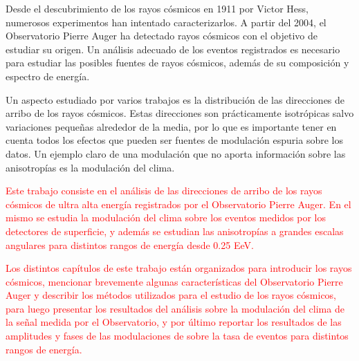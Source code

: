 


Desde el descubrimiento de los rayos cósmicos en 1911 por Victor Hess, numerosos experimentos han intentado caracterizarlos. A partir del 2004, el Observatorio Pierre Auger ha detectado rayos cósmicos con el objetivo de estudiar su origen. Un análisis adecuado de los eventos registrados es necesario para estudiar las posibles fuentes de rayos cósmicos, además de su composición y espectro de energía.

Un aspecto estudiado por varios trabajos \cite{collaboration2013pierre} \cite{data} es la distribución de las direcciones de arribo de los rayos cósmicos. Estas direcciones son prácticamente isotrópicas salvo variaciones pequeñas alrededor de la media, por lo que es importante tener en cuenta todos los efectos que pueden ser fuentes de modulación espuria sobre los datos. Un ejemplo claro de una modulación que no aporta información sobre las anisotropías es la modulación del clima.

\textcolor{red}{Este trabajo consiste en el análisis de las direcciones de arribo de los rayos cósmicos de ultra alta energía registrados por el Observatorio Pierre Auger. En el mismo se estudia la modulación del clima sobre los eventos medidos por los detectores de superficie, y además se estudian las anisotropías a grandes escalas angulares para distintos rangos de energía desde 0.25 EeV.}  %

\textcolor{red}{Los distintos capítulos de este trabajo están organizados para introducir los rayos cósmicos, mencionar brevemente algunas características del Observatorio Pierre Auger y describir los métodos utilizados para el estudio de los rayos cósmicos, para luego presentar los resultados del análisis sobre la modulación del clima de la señal medida por el Observatorio, y por último reportar los resultados de las amplitudes y fases de las modulaciones de sobre la tasa de eventos para distintos rangos de energía.}
